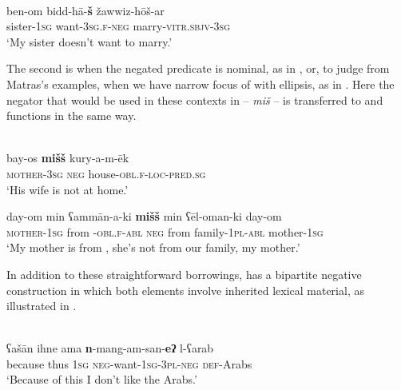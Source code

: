 \documentclass[output=paper]{langsci/langscibook}
\begin{document}
\ea\label{domneg}
{         \citep[351]{Matras2012}}\\
\gll ben-om bidd-hā-\textbf{š} žawwiz-hōš-ar\\
     sister-\textsc{1sg} want\textsc{{}-3sg.f-neg} marry\textsc{-vitr.sbjv-3sg}\\
\glt ‘My sister doesn’t want to marry.’
\z

The second is when the negated predicate is nominal, as in , or, to judge from Matras’s examples, when we have narrow focus of  with ellipsis, as in . Here the negator that would be used in these contexts in  – \textit{miš} – is transferred to  and functions in the same way.

\ea
{  \citep[350]{Matras2012}}\\
\ea\gll bay-os \textbf{mišš} kury-a-m-ēk\label{jer.a}\\
     \textsc{\textup{mother-}}\textsc{3sg} \textsc{neg} house\textsc{-obl.f-loc-pred.sg}  \\
\glt ‘His wife is not at home.’

\ex\gll day-om min ʕammān-a-ki \textbf{mišš} min ʕēl-oman-ki day-om\label{jer.b}\\
     \textsc{\textup{mother-1}}\textsc{sg} from -\textsc{obl.f-abl} \textsc{neg} from family-\textsc{1pl-abl} mother\textsc{-1sg}\\
\glt ‘My mother is from , she’s not from our family, my mother.’
\z
\z

In addition to these straightforward borrowings,  has a bipartite negative construction in which both elements involve inherited lexical material, as illustrated in .

\ea\label{jer.c}
{         \citep[117]{Matras2012}}\\
\gll ʕašān ihne ama \textbf{n}-mang-am-san-\textbf{eʔ} l-ʕarab\\
     because thus \textsc{1sg} \textsc{neg-}want-\textsc{1sg-3pl-neg} \textsc{def-}Arabs\\
\glt ‘Because of this I don’t like the Arabs.’
\z
\end{document}
